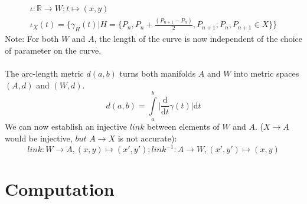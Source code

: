 \documentclass{report}
\begin{document}
\begin{align}
\iota: \mathbb{R} \rightarrow W; t \mapsto (x,y)\\
\iota_{X}(t) = \{ \gamma_{H}(t)\lvert H=\{P_{n},P_{n}+\frac{(P_{n+1}-P_{n})}{2},P_{n+1}; P_{n}, P_{n+1} \in X\}\}
\end{align}
Note: For both $W$ and $A$, the length of the curve is now independent of the choice of parameter on the curve. ~\cite[1.1]{Taimanov}\\\\
The arc-length metric $d(a,b)$ turns both manifolds $A$ and $W$ into metric spaces $(A,d)$ and $(W,d)$. ~\cite[1.1.3]{Klingenberg}
\begin{equation}
d(a,b) = \int \limits _{a}^{b}\lvert \frac{\mathrm{d}}{\mathrm{d}t}\gamma(t)\rvert \mathrm{d}t\label{eq:1}
\end{equation}
We can now establish an injective $link$ between elements of $W$ and $A$. ($X \rightarrow A$ would be injective, $but$ $A \rightarrow X$ is not accurate):
\begin{equation}
link: W \rightarrow A, (x,y) \mapsto (x',y'); link^{-1}: A \rightarrow W, (x',y') \mapsto (x,y)
\end{equation}

\chapter{Computation}
\end{document}

